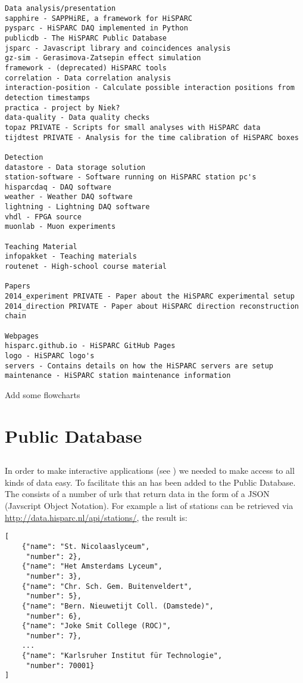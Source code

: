 \begin{verbatim}
Data analysis/presentation
sapphire - SAPPHiRE, a framework for HiSPARC
pysparc - HiSPARC DAQ implemented in Python
publicdb - The HiSPARC Public Database
jsparc - Javascript library and coincidences analysis
gz-sim - Gerasimova-Zatsepin effect simulation
framework - (deprecated) HiSPARC tools
correlation - Data correlation analysis
interaction-position - Calculate possible interaction positions from detection timestamps
practica - project by Niek?
data-quality - Data quality checks
topaz PRIVATE - Scripts for small analyses with HiSPARC data
tijdtest PRIVATE - Analysis for the time calibration of HiSPARC boxes

Detection
datastore - Data storage solution
station-software - Software running on HiSPARC station pc's
hisparcdaq - DAQ software
weather - Weather DAQ software
lightning - Lightning DAQ software
vhdl - FPGA source
muonlab - Muon experiments

Teaching Material
infopakket - Teaching materials
routenet - High-school course material

Papers
2014_experiment PRIVATE - Paper about the HiSPARC experimental setup
2014_direction PRIVATE - Paper about HiSPARC direction reconstruction chain

Webpages
hisparc.github.io - HiSPARC GitHub Pages
logo - HiSPARC logo's
servers - Contains details on how the HiSPARC servers are setup
maintenance - HiSPARC station maintenance information
\end{verbatim}

Add some flowcharts


\section{\hisparc Public Database}

\subsection{\api}

In order to make interactive applications (see \jsparc) we needed to make
access to all kinds of data easy. To facilitate this an \api has been
added to the Public Database. The \api consists of a number of urls that
return data in the form of a JSON (Javscript Object Notation). For
example a list of \hisparc stations can be retrieved via
\url{http://data.hisparc.nl/api/stations/}, the result is:

\begin{verbatim}
[
    {"name": "St. Nicolaaslyceum",
     "number": 2},
    {"name": "Het Amsterdams Lyceum",
     "number": 3},
    {"name": "Chr. Sch. Gem. Buitenveldert",
     "number": 5},
    {"name": "Bern. Nieuwetijt Coll. (Damstede)",
     "number": 6},
    {"name": "Joke Smit College (ROC)",
     "number": 7},
    ...
    {"name": "Karlsruher Institut für Technologie",
     "number": 70001}
]
\end{verbatim}

